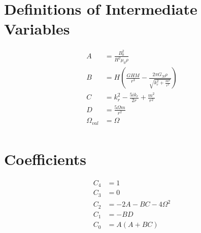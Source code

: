 \documentclass{article}
\begin{document}
\section*{Definitions of Intermediate Variables}
\begin{align*}
A &= \frac{B_{0}^{2}}{H^{2} \mu_{0} \rho} \\
B &= H \left(\frac{G H M}{r^{3}} - \frac{2 \pi G_{N} \rho}{\sqrt{k_{r}^{2} + \frac{m^{2}}{r^{2}}}}\right) \\
C &= k_{r}^{2} - \frac{5 i k_{r}}{2 r} + \frac{m^{2}}{r^{2}} \\
D &= \frac{5 \Omega m}{r^{2}} \\
\Omega_{val} &= \Omega \\
\end{align*}

\section*{Coefficients}
\begin{align*}
C_4 &= 1 \\
C_3 &= 0 \\
C_2 &= - 2 A - B C - 4 \Omega^{2} \\
C_1 &= - B D \\
C_0 &= A \left(A + B C\right) \\
\end{align*}
\end{document}
